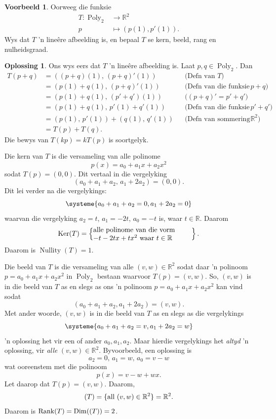 \documentclass[a4paper,11pt]{book}
\theoremstyle{definition}
\newtheorem{example_environment}{Voorbeeld}[chapter]
\newtheorem*{solution}{Oplossing}
\newenvironment{example}
	{
		\begin{oframed}
		\begin{example_environment}
	}
	{
		\end{example_environment}
		\end{oframed}
	}
\DeclareMathOperator{\Poly}{Poly}
\DeclareMathOperator{\Dim}{Dim}
\DeclareMathOperator{\Ker}{Ker}
\DeclareMathOperator{\Nullity}{Nullity}
\DeclareMathOperator{\Rank}{Rank}
\let\Im\relax
\DeclareMathOperator{\Im}{Im} %
\begin{document}
\begin{example} Oorweeg die funksie
	\begin{align*}
		T : \Poly_2 & \rightarrow \mathbb{R}^2 \\
		p & \mapsto (p(1), p'(1)).
	\end{align*}
	Wys dat $T$ 'n line{\^e}re afbeelding is, en bepaal $T$ se kern, beeld,
	rang en nulheidsgraad.
	\begin{solution} Ons wys eers dat $T$ 'n line{\^e}re afbeelding is.
		Laat $p,q \in \Poly_2$. Dan
		\begin{align*}
			T(p + q) &= ( (p+q)(1), \, (p+q)'(1) )  && \mbox{(Defn van
			$T$)} \\
			&= (p(1) + q(1), \, (p+q)'(1) ) && \mbox{(Defn van die funksie
			$p+q$)} \\
			&= (p(1) + q(1), \, (p'+q')(1) ) && \mbox{($(p+q)' = p'+q'$)}
			\\
			&= (p(1) + q(1), \, p'(1) + q'(1)) && \mbox{(Defn van die
			funksie $p' + q'$)} \\
			&= (p(1), \, p'(1)) + (q(1), \, q'(1)) && \mbox{(Defn van
			sommering in $\mathbb{R}^2$)} \\
			&= T(p) + T(q).
		\end{align*}
		Die bewys van $T(kp) = kT(p)$ is soortgelyk.

		Die kern van $T$ is die versameling van alle polinome
		\[
			p(x) = a_0 + a_1 x + a_2 x^2
		\]
		sodat $T(p) = (0,0)$. Dit vertaal in die vergelyking
		\[
			(a_0 + a_1 + a_2, \, a_1 + 2 a_2) = (0,0).
		\]
		Dit lei verder na die vergelykings:
		\[
			\systeme{ a_0 + a_1 + a_2 = 0, a_1 + 2a_2 = 0}
		\]
		waarvan die vergelyking $a_2 = t$, $a_1 = - 2t$, $a_0 = -t$ is,
		waar $t \in \mathbb{R}$. Daarom
		\[
			\Ker(T) =  \left\{ \mbox{\begin{minipage}{5cm} alle polinome
			van die vorm  \\ $ -t -2t x + t x^2$  waar  $t \in \mathbb{R}$
			\end{minipage}} \right\}.
		\]
		Daarom is $\Nullity(T) = 1$.

		Die beeld van $T$ is die versameling van alle $(v,w) \in
		\mathbb{R}^2$ sodat daar 'n polinoom $p = a_0 + a_1 x + a_2 x^2$ in
		$\Poly_2$ bestaan waarvoor $T(p) = (v,w)$. So, $(v,w)$ is in die
		beeld van $T$ as en slegs as ons 'n polinoom $p = a_0 + a_1x + a_2
		x^2$ kan vind sodat
		\[
			(a_0 + a_1 + a_2, a_1 + 2a_2) = (v,w).
		\]
		Met ander woorde, $(v,w)$ is in die beeld van $T$ as en slegs as
		die vergelykings
		\[
			\systeme{ a_0 + a_1 + a_2 = v, a_1 + 2a_2 = w}
		\]
		'n oplossing het vir een of ander $a_0, a_1, a_2$. Maar hierdie
		vergelykings het \emph{altyd} 'n oplossing, vir \emph{alle} $(v,w)
		\in \mathbb{R}^2$.  Byvoorbeeld, een oplossing is
		\[
			a_2 = 0 ,  \, a_1 = w, \, a_0 = v - w
		\]
		wat ooreenstem met die polinoom 
		\begin{equation}
			\label{one-soln-for-preimage} p(x) = v-w + wx.
		\end{equation}
		Let daarop dat $T(p) = (v,w)$. Daarom,
		\[
			\Im(T) = \{\mbox{all } (v,w) \in \mathbb{R}^2 \} =
			\mathbb{R}^2.
		\] 
		Daarom is $\Rank (T) = \Dim (\Im(T)) = 2$.


\end{solution}
\end{example}
\end{document}
